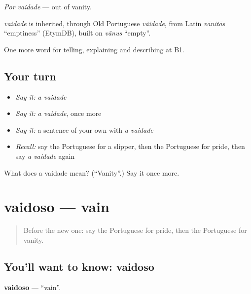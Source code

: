 \emph{Por vaidade} — out of vanity.

\begin{cousinweb}
\emph{vaidade} is inherited, through Old Portuguese \emph{vãidade}, from Latin \emph{vānitās} \textquotedblleft{}emptiness\textquotedblright{} (EtymDB), built on \emph{vānus} \textquotedblleft{}empty\textquotedblright{}.
\end{cousinweb}

\begin{grammarlens}[title={What you've built}]
One more word for telling, explaining and describing at B1.
\end{grammarlens}

\subsection*{Your turn}
\begin{itemize}
\raggedright
  \item \emph{Say it:} \emph{a vaidade}
  \item \emph{Say it:} \emph{a vaidade}, once more
  \item \emph{Say it:} a sentence of your own with \emph{a vaidade}
  \item \emph{Recall:} say the Portuguese for a slipper, then the Portuguese for pride, then say \emph{a vaidade} again
\end{itemize}

\begin{tcolorbox}[breakable,colback=teal!4,colframe=teal!35!black,title={Before you move on}]
What does a vaidade mean? (\textquotedblleft{}Vanity\textquotedblright{}.) Say it once more.
\end{tcolorbox}
\section[vaidoso]{vaidoso — vain}

\label{lesson:PT-C467-vaidoso}



\begin{quote}
Before the new one: say the Portuguese for pride, then the Portuguese for vanity.
\end{quote}

\subsection*{You'll want to know: vaidoso}
\textbf{vaidoso} — \textquotedblleft{}vain\textquotedblright{}.

